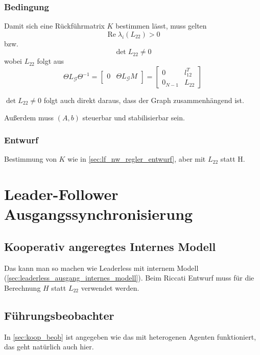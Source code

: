 \subsubsection{Bedingung}
Damit sich eine Rückführmatrix $K$ bestimmen lässt, muss gelten
\begin{equation}
    \operatorname{Re} \lambda_i(L_{22}) > 0
\end{equation}
bzw.
\begin{equation}
    \det L_{22} \neq 0
\end{equation}
wobei $L_{22}$ folgt aus
\begin{equation}
    \Theta L_\mathcal{G} \Theta^{-1} = \begin{bmatrix}
        0 & \Theta L_\mathcal{G}M
    \end{bmatrix}
    = \begin{bmatrix}
        0 & l_{12}^T \\
        0_{N-1} & L_{22}
    \end{bmatrix}
\end{equation}

$\det L_{22} \neq 0$ folgt auch direkt daraus, dass der Graph zusammenhängend ist.

Außerdem muss $(A,b)$ steuerbar und stabilisierbar sein.

\subsubsection{Entwurf}
Bestimmung von $K$ wie in \ref{sec:lf_nw_regler_entwurf},
aber mit $L_{22}$ statt H.


\pagebreak
\section{Leader-Follower Ausgangssynchronisierung}
\subsection{Kooperativ angeregtes Internes Modell}
Das kann man so machen wie Leaderless mit internem Modell
(\ref{sec:leaderless_ausgang_internes_modell}).
Beim Riccati Entwurf muss für die Berechnung $H$ statt $L_{22}$ verwendet
werden.

\subsection{Führungsbeobachter}
In \ref{sec:koop_beob} ist angegeben wie das mit heterogenen Agenten funktioniert,
das geht natürlich auch hier.

